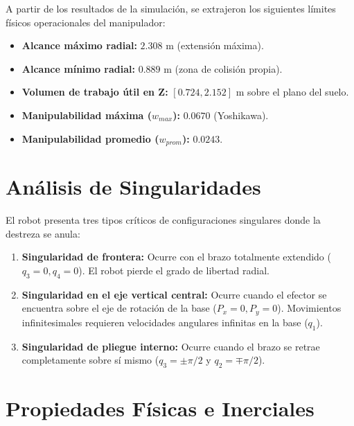 A partir de los resultados de la simulación, se extrajeron los siguientes límites físicos operacionales del manipulador:
\begin{itemize}
    \item \textbf{Alcance máximo radial:} $2.308\text{ m}$ (extensión máxima).
    \item \textbf{Alcance mínimo radial:} $0.889\text{ m}$ (zona de colisión propia).
    \item \textbf{Volumen de trabajo útil en Z:} $[0.724, 2.152]\text{ m}$ sobre el plano del suelo.
    \item \textbf{Manipulabilidad máxima ($w_{max}$):} $0.0670$ (Yoshikawa).
    \item \textbf{Manipulabilidad promedio ($w_{prom}$):} $0.0243$.
\end{itemize}

\section{Análisis de Singularidades}

El robot presenta tres tipos críticos de configuraciones singulares donde la destreza se anula:
\begin{enumerate}
    \item \textbf{Singularidad de frontera:} Ocurre con el brazo totalmente extendido ($q_3 = 0, q_4 = 0$). El robot pierde el grado de libertad radial.
    \item \textbf{Singularidad en el eje vertical central:} Ocurre cuando el efector se encuentra sobre el eje de rotación de la base ($P_x=0, P_y=0$). Movimientos infinitesimales requieren velocidades angulares infinitas en la base ($q_1$).
    \item \textbf{Singularidad de pliegue interno:} Ocurre cuando el brazo se retrae completamente sobre sí mismo ($q_3 = \pm \pi/2$ y $q_2 = \mp \pi/2$).
\end{enumerate}

\section{Propiedades Físicas e Inerciales}

